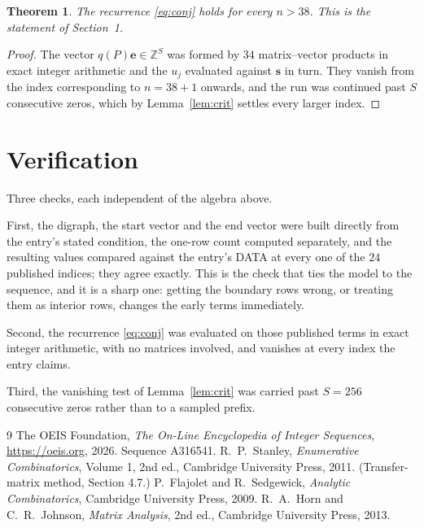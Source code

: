 \documentclass[11pt,a4paper]{article}
\theoremstyle{plain}
\newtheorem{theorem}{Theorem}
\theoremstyle{definition}
\begin{document}
\begin{theorem}
The recurrence \eqref{eq:conj} holds for every $n>38$. This is the statement of
Section~1.
\end{theorem}

\begin{proof}
The vector $q(P)\mathbf{e}\in\mathbb{Z}^{S}$ was formed by $34$ matrix--vector
products in exact integer arithmetic and the $u_j$ evaluated against $\mathbf{s}$ in turn.
They vanish from the index corresponding to $n=38+1$ onwards, and the run was continued
past $S$ consecutive zeros, which by Lemma~\ref{lem:crit} settles every larger index.
\end{proof}

\section{Verification}

Three checks, each independent of the algebra above.

First, the digraph, the start vector and the end vector were built directly from the
entry's stated condition, the one-row count computed separately, and the resulting values
compared against the entry's DATA at every one of the $24$ published indices; they
agree exactly. This is the check that ties the model to the sequence, and it is a sharp one:
getting the boundary rows wrong, or treating them as interior rows, changes the early terms
immediately.

Second, the recurrence \eqref{eq:conj} was evaluated on those published terms in exact
integer arithmetic, with no matrices involved, and vanishes at every index the entry claims.

Third, the vanishing test of Lemma~\ref{lem:crit} was carried past $S=256$ consecutive
zeros rather than to a sampled prefix.

\begin{thebibliography}{9}
 The OEIS Foundation, \emph{The On-Line Encyclopedia of Integer
Sequences}, \url{https://oeis.org}, 2026. Sequence A316541.
 R.~P.~Stanley, \emph{Enumerative Combinatorics}, Volume 1, 2nd ed.,
Cambridge University Press, 2011. (Transfer-matrix method, Section 4.7.)
 P.~Flajolet and R.~Sedgewick, \emph{Analytic Combinatorics}, Cambridge
University Press, 2009.
 R.~A.~Horn and C.~R.~Johnson, \emph{Matrix Analysis}, 2nd ed., Cambridge
University Press, 2013.
\end{thebibliography}
\end{document}

